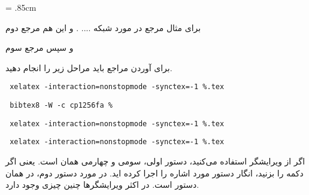 \documentclass{report}
\begin{document}
\baselineskip = .85cm


برای مثال مرجع {\cite{Beasley}} در مورد شبکه .... . و این هم مرجع دوم {\cite{Meyer2004}} 

و سپس مرجع سوم {\cite{Rafsanjani2010}}

برای آوردن مراجع باید مراحل زیر را انجام دهید.
\begin{itemize}
\begin{LTRitems}
\item
\verb+ xelatex -interaction=nonstopmode -synctex=-1 %.tex+
\item
\verb+ bibtex8 -W -c cp1256fa % +
\item
\verb+ xelatex -interaction=nonstopmode -synctex=-1 %.tex+
\item
\verb+ xelatex -interaction=nonstopmode -synctex=-1 %.tex+
\end{LTRitems}
\end{itemize}
اگر از ویرایشگر {} استفاده می‌کنید، دستور اولی، سومی و چهارمی همان {} است. یعنی اگر دکمه {} را بزنید، انگار دستور مورد اشاره را اجرا کرده اید. در مورد دستور دوم، در {} همان دستور {} است. در اکثر ویرایشگرها چنین چیزی وجود دارد.  


\cite{R1}


\end{document}
